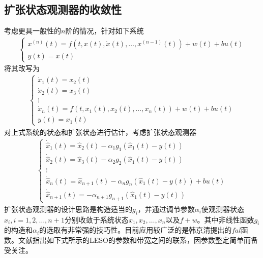 \subsection{扩张状态观测器的收敛性}
考虑更具一般性的$ n $阶的情况，针对如下系统
\begin{align}\left\{\begin{array}{l}
x^{(n)}(t)=f\left(t, x(t), \dot{x}(t), \ldots, x^{(n-1)}(t)\right)+w(t)+bu(t) \\
y(t)=x(t)
\end{array}\right.\end{align}
将其改写为
\begin{align}\left\{\begin{array}{l}
\dot{x}_{1}(t)=x_{2}(t) \\
\dot{x}_{2}(t)=x_{3}(t)  \\
\vdots \\
\dot{x}_{n}(t)=f\left(t, x_{1}(t), x_{2}(t), \ldots, x_{n}(t)\right) +w(t)+bu(t)	\\
y(t)=x_{1}(t)
\end{array}\right.	\label{eq_n_diff}
\end{align}
对上式系统的状态和扩张状态进行估计，考虑扩张状态观测器
\begin{align}
\left\{\begin{array}{l}
\dot{\hat{x}}_{1}(t)=\hat{x}_{2}(t)-\alpha_{1} g_{1}\left(\hat{x}_{1}(t)-y(t)\right) \\
\dot{\hat{x}}_{2}(t)=\hat{x}_{3}(t)-\alpha_{2} g_{2}\left(\hat{x}_{1}(t)-y(t)\right) \\
\vdots \\
\dot{\hat{x}}_{n}(t)=\hat{x}_{n+1}(t)-\alpha_{n} g_{n}\left(\hat{x}_{1}(t)-y(t)\right)+bu(t) \\
\dot{\hat{x}}_{n+1}(t)=-\alpha_{n+1} g_{n+1}\left(\hat{x}_{1}(t)-y(t)\right)
\end{array}\right.	
\end{align}
扩张状态观测器的设计思路是构造适当的$ g_i $，并通过调节参数$ \alpha_i $使观测器状态$ \hat{x}_i,i=1,2,\dots,n+1 $分别收敛于系统状态$ x_1,x_2,\dots,x_n $以及$ f+w $。其中非线性函数$ g_i $的构造和$ \alpha_i $的选取有非常强的技巧性。目前应用较广泛的是韩京清\parencite{HanJingQing_2008}提出的$ fal $函数。文献\parencite{Gao_2006a}指出如下式所示的LESO的参数和带宽之间的联系，因参数整定简单而备受关注。

